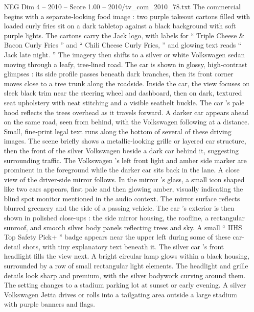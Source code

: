 \begin{textsample}{NEG Dim 4 – 2010 – Score 1.00 – 2010/tv\_com\_2010\_78.txt}  \label{ex:f4_neg_080}
The commercial begins with a separate-looking food image : two purple takeout cartons filled with loaded curly fries sit on a dark tabletop against a black background with soft purple lights.
The cartons carry the Jack logo, with labels for “ Triple Cheese \& Bacon Curly Fries ” and “ Chili Cheese Curly Fries, ” and glowing text reads “ Jack late night. ” The imagery then shifts to a silver or white Volkswagen sedan moving through a leafy, tree-lined road.
The car is shown in glossy, high-contrast glimpses : its side profile passes beneath dark branches, then its front corner moves close to a tree trunk along the roadside.
Inside the car, the view focuses on sleek black trim near the steering wheel and dashboard, then on dark, textured seat upholstery with neat stitching and a visible seatbelt buckle.
The car ’s pale hood reflects the trees overhead as it travels forward.
A darker car appears ahead on the same road, seen from behind, with the Volkswagen following at a distance.
Small, fine-print legal text runs along the bottom of several of these driving images.
The scene briefly shows a metallic-looking grille or layered car structure, then the front of the silver Volkswagen beside a dark car behind it, suggesting surrounding traffic.
The Volkswagen ’s left front light and amber side marker are prominent in the foreground while the darker car sits back in the lane.
A close view of the driver-side mirror follows.
In the mirror ’s glass, a small icon shaped like two cars appears, first pale and then glowing amber, visually indicating the blind spot monitor mentioned in the audio context.
The mirror surface reflects blurred greenery and the side of a passing vehicle.
The car ’s exterior is then shown in polished close-ups : the side mirror housing, the roofline, a rectangular sunroof, and smooth silver body panels reflecting trees and sky.
A small “ IIHS Top Safety Pick+ ” badge appears near the upper left during some of these car-detail shots, with tiny explanatory text beneath it.
The silver car ’s front headlight fills the view next.
A bright circular lamp glows within a black housing, surrounded by a row of small rectangular light elements.
The headlight and grille details look sharp and premium, with the silver bodywork curving around them.
The setting changes to a stadium parking lot at sunset or early evening.
A silver Volkswagen Jetta drives or rolls into a tailgating area outside a large stadium with purple banners and flags.

\end{textsample}
